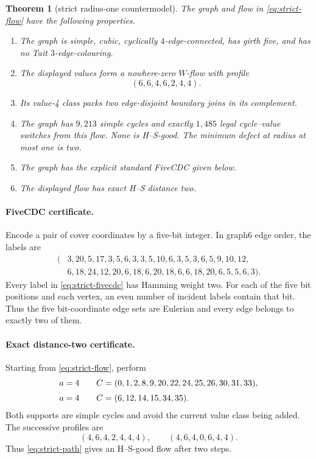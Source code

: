 \documentclass[11pt]{article}
\newtheorem{theorem}{Theorem}[section]
\theoremstyle{definition}
\theoremstyle{remark}
\numberwithin{equation}{section}
\begin{document}
\begin{theorem}[strict radius-one countermodel]\label{thm:counter}
The graph and flow in \eqref{eq:strict-flow} have the following properties.
\begin{enumerate}
\item The graph is simple, cubic, cyclically \(4\)-edge-connected, has
      girth five, and has no Tait \(3\)-edge-colouring.
\item The displayed values form a nowhere-zero \(W\)-flow with profile
      \[
                           (6,6,4,6,2,4,4).
      \]
\item Its value-4 class packs two edge-disjoint boundary joins in its
      complement.
\item The graph has \(9{,}213\) simple cycles and exactly \(1{,}485\)
      legal cycle--value switches from this flow.  None is H--S-good.
      The minimum defect at radius at most one is two.
\item The graph has the explicit standard FiveCDC given below.
\item The displayed flow has exact H--S distance two.
\end{enumerate}
\end{theorem}

\paragraph{FiveCDC certificate.}
Encode a pair of cover coordinates by a five-bit integer.  In graph6
edge order, the labels are
\begin{equation}
\begin{split}
(&3,20,5,17,3,5,6,3,3,5,10,6,3,5,3,6,5,9,10,12,\\
 &6,18,24,12,20,6,18,6,20,18,6,6,18,20,6,5,5,6,3).
\end{split}
\label{eq:strict-fivecdc}
\end{equation}
Every label in \eqref{eq:strict-fivecdc} has Hamming weight two.  For each of the five bit
positions and each vertex, an even number of incident labels contain
that bit.  Thus the five bit-coordinate edge sets are Eulerian and every
edge belongs to exactly two of them.

\paragraph{Exact distance-two certificate.}
Starting from \eqref{eq:strict-flow}, perform
\begin{equation}
\begin{array}{c@{\qquad}l}
 a=4&
 C=(0,1,2,8,9,20,22,24,25,26,30,31,33),\\[2mm]
 a=4&
 C=(6,12,14,15,34,35).
\end{array}
\label{eq:strict-path}
\end{equation}
Both supports are simple cycles and avoid the current value class being
added.  The successive profiles are
\begin{equation}
                (4,6,4,2,4,4,4),\qquad(4,6,4,0,6,4,4).
\label{eq:strict-path-profiles}
\end{equation}
Thus \eqref{eq:strict-path} gives an H--S-good flow after two steps.
\end{document}
